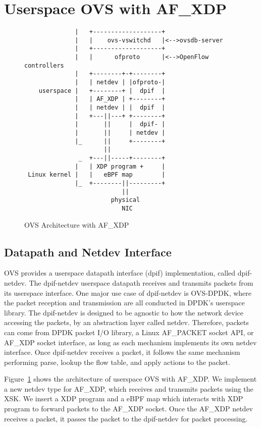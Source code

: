 \documentclass[10pt,numbers,reprint]{sigplanconf}
\begin{document}
\section{Userspace OVS with AF\_XDP}
\label{sec:af_xdp}
\begin{figure}
{\scriptsize
\begin{verbatim}
              |   +-------------------+
              |   |    ovs-vswitchd   |<-->ovsdb-server
              |   +-------------------+
              |   |      ofproto      |<-->OpenFlow controllers
              |   +--------+-+--------+ 
              |   | netdev | |ofproto-|
    userspace |   +--------+ |  dpif  |
              |   | AF_XDP | +--------+
              |   | netdev | |  dpif  |
              |   +---||---+ +--------+
              |       ||     |  dpif- |
              |       ||     | netdev |
              |_      ||     +--------+  
                      ||         
               _  +---||-----+--------+
              |   | XDP program +     |
 Linux kernel |   |   eBPF map        |
              |_  +--------||---------+
                           ||
                        physical
                           NIC
\end{verbatim}
}
\vspace{-1.0em}
\caption{OVS Architecture with AF\_XDP}
\label{ovsafxdp}
\vspace{-1.0em}
\end{figure}

\subsection{Datapath and Netdev Interface}
OVS provides a userspace datapath interface (dpif) implementation, called
dpif-netdev. The dpif-netdev userspace datapath receives and transmits
packets from its userspace interface.  One major use case of dpif-netdev
is OVS-DPDK, where the packet reception and transmission
are all conducted in DPDK's userspace
library. The dpif-netdev is designed to be agnostic to how the network
device accessing the packets, by an abstraction layer called netdev.
Therefore, packets can come from DPDK packet I/O library,
a Linux AF\_PACKET socket API, or AF\_XDP socket interface,
as long as each mechanism implements its own netdev interface.
Once dpif-netdev receives a packet, it follows the same mechanism performing
parse, lookup the flow table, and apply actions to the packet.

Figure~\ref{ovsafxdp} shows the architecture of userspace OVS with AF\_XDP.
We implement a new netdev type for AF\_XDP, which receives and transmits
packets using the XSK.  We insert a XDP program and a eBPF map which interacts
with XDP program to forward packets to the AF\_XDP socket.
Once the AF\_XDP netdev receives a packet, it passes the packet to the
dpif-netdev for packet processing.
\end{document}
